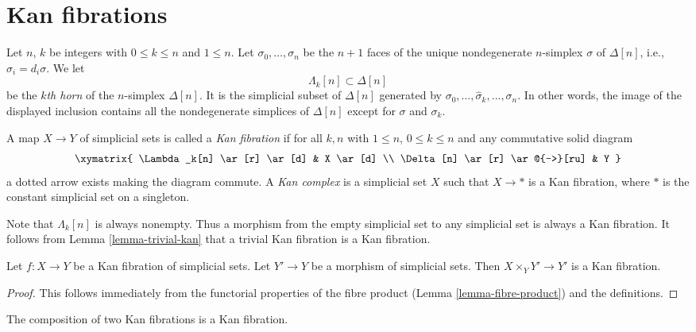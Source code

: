 \section{Kan fibrations}
\label{section-kan}

\noindent
Let $n$, $k$ be integers with $0 \leq k \leq n$ and $1 \leq n$.
Let $\sigma_0, \ldots, \sigma_n$
be the $n + 1$ faces of the unique nondegenerate $n$-simplex $\sigma$
of $\Delta[n]$, i.e., $\sigma_i = d_i\sigma$. We let
$$
\Lambda_k[n] \subset \Delta[n]
$$
be the {\it $k$th horn} of the $n$-simplex $\Delta[n]$. It is the
simplicial subset of $\Delta[n]$ generated by
$\sigma_0, \ldots, \hat \sigma_k, \ldots, \sigma_n$. In other words,
the image of the displayed inclusion contains all the nondegenerate
simplices of $\Delta[n]$ except for $\sigma$ and $\sigma_k$.

\begin{definition}
\label{definition-kan}
A map $X \to Y$ of simplicial sets is called a {\it Kan fibration}
if for all $k, n$ with $1 \leq n$, $0 \leq k \leq n$ and any commutative
solid diagram
$$
\xymatrix{
\Lambda_k[n] \ar[r] \ar[d] & X \ar[d] \\
\Delta[n] \ar[r] \ar@{-->}[ru] & Y
}
$$
a dotted arrow exists making the diagram commute. A {\it Kan complex}
is a simplicial set $X$ such that $X \to *$ is a Kan fibration, where
$*$ is the constant simplicial set on a singleton.
\end{definition}

\noindent
Note that $\Lambda_k[n]$ is always nonempty. Thus a morphism from the empty
simplicial set to any simplicial set is always a Kan fibration. It follows
from Lemma \ref{lemma-trivial-kan} that a trivial Kan fibration is a
Kan fibration.

\begin{lemma}
\label{lemma-kan-base-change}
Let $f : X \to Y$ be a Kan fibration of simplicial sets.
Let $Y' \to Y$ be a morphism of simplicial sets.
Then $X \times_Y Y' \to Y'$ is a Kan fibration.
\end{lemma}

\begin{proof}
This follows immediately from the functorial properties of the fibre
product (Lemma \ref{lemma-fibre-product}) and the definitions.
\end{proof}

\begin{lemma}
\label{lemma-kan-composition}
The composition of two Kan fibrations is a Kan fibration.
\end{lemma}

